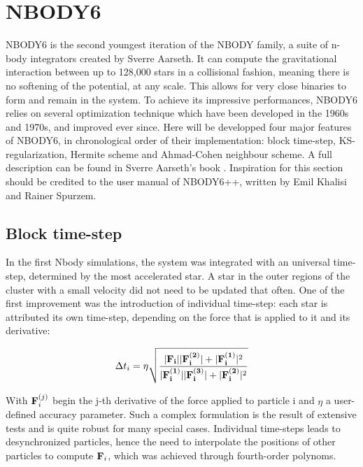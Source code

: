 \newpage
\section{NBODY6}


NBODY6 is the second youngest iteration of the NBODY family, a suite of n-body integrators created by Sverre Aarseth. It can compute the gravitational interaction between up to 128,000 stars in a collisional fashion, meaning there is no softening of the potential, at any scale. This allows for very close binaries to form and remain in the system. To achieve its impressive performances, NBODY6 relies on several optimization technique which have been developed in the 1960s and 1970s, and improved ever since. Here will be developped four major features of NBODY6, in chronological order of their implementation: block time-step, KS-regularization, Hermite scheme and Ahmad-Cohen neighbour scheme. A full description can be found in Sverre Aarseth's book \citep{Aarseth2003}. Inspiration for this section should be credited to the user manual of NBODY6++, written by Emil Khalisi and Rainer Spurzem.

\subsection{Block time-step}
 
In the first Nbody simulations, the system was integrated with an universal time-step, determined by the most accelerated star. A star in the outer regions of the cluster with a small velocity did not need to be updated that often. One of the first improvement  was the introduction of individual time-step: each star is attributed its own time-step, depending on the force that is applied to it and its derivative:

\begin{equation}
\Delta t_i =  \eta \sqrt{\frac{ |\bold{F_i}||\bold{F^{(2)}_i}| + |\bold{F^{(1)}_i}|^2 }{|\bold{F^{(1)}_i}||\bold{F^{(3)}_i}| + |\bold{F^{(2)}_i}|^2}}
\end{equation}
 
With $\bold{F}^{(j)}_i$ begin the j-th derivative of the force applied to particle i and $\eta$ a user-defined accuracy parameter. Such a complex formulation is the result of extensive tests and is quite robust for many special cases. Individual time-steps leads to desynchronized particles, hence the need to interpolate the positions of other particles to compute $\bold{F}_i$, which was achieved through fourth-order polynoms.
 
